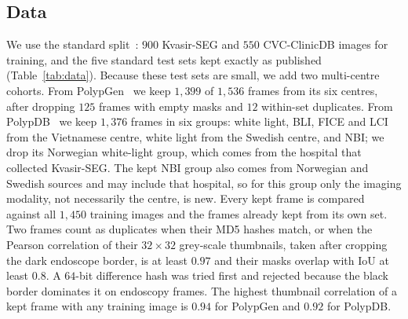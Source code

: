 \documentclass{ieeeaccess}
\begin{document}
\subsection{Data}
\label{sec:data}
We use the standard split~\cite{fan2020pranet}: $900$ Kvasir-SEG and $550$ CVC-ClinicDB images for training, and the five standard test sets kept exactly as published (Table~\ref{tab:data}). Because these test sets are small, we add two multi-centre cohorts. From PolypGen~\cite{ali2023polypgen} we keep $1{,}399$ of $1{,}536$ frames from its six centres, after dropping $125$ frames with empty masks and $12$ within-set duplicates. From PolypDB~\cite{jha2024polypdb} we keep $1{,}376$ frames in six groups: white light, BLI, FICE and LCI from the Vietnamese centre, white light from the Swedish centre, and NBI; we drop its Norwegian white-light group, which comes from the hospital that collected Kvasir-SEG. The kept NBI group also comes from Norwegian and Swedish sources and may include that hospital, so for this group only the imaging modality, not necessarily the centre, is new. Every kept frame is compared against all $1{,}450$ training images and the frames already kept from its own set. Two frames count as duplicates when their MD5 hashes match, or when the Pearson correlation of their $32\times32$ grey-scale thumbnails, taken after cropping the dark endoscope border, is at least $0.97$ and their masks overlap with IoU at least $0.8$. A $64$-bit difference hash was tried first and rejected because the black border dominates it on endoscopy frames. The highest thumbnail correlation of a kept frame with any training image is $0.94$ for PolypGen and $0.92$ for PolypDB.
\end{document}
